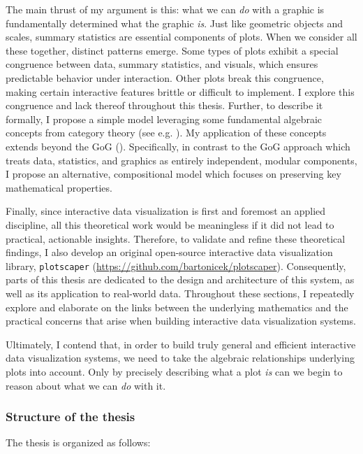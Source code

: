 \documentclass[
  openany]{book}
\theoremstyle{definition}
\theoremstyle{definition}
\theoremstyle{definition}
\theoremstyle{definition}
\theoremstyle{remark}
\begin{document}
The main thrust of my argument is this: what we can \emph{do} with a graphic is fundamentally determined what the graphic \emph{is}. Just like geometric objects and scales, summary statistics are essential components of plots. When we consider all these together, distinct patterns emerge. Some types of plots exhibit a special congruence between data, summary statistics, and visuals, which ensures predictable behavior under interaction. Other plots break this congruence, making certain interactive features brittle or difficult to implement. I explore this congruence and lack thereof throughout this thesis. Further, to describe it formally, I propose a simple model leveraging some fundamental algebraic concepts from category theory (see e.g. ). My application of these concepts extends beyond the GoG (). Specifically, in contrast to the GoG approach which treats data, statistics, and graphics as entirely independent, modular components, I propose an alternative, compositional model which focuses on preserving key mathematical properties.

Finally, since interactive data visualization is first and foremost an applied discipline, all this theoretical work would be meaningless if it did not lead to practical, actionable insights. Therefore, to validate and refine these theoretical findings, I also develop an original open-source interactive data visualization library, \texttt{plotscaper} (\url{https://github.com/bartonicek/plotscaper}). Consequently, parts of this thesis are dedicated to the design and architecture of this system, as well as its application to real-world data. Throughout these sections, I repeatedly explore and elaborate on the links between the underlying mathematics and the practical concerns that arise when building interactive data visualization systems.

Ultimately, I contend that, in order to build truly general and efficient interactive data visualization systems, we need to take the algebraic relationships underlying plots into account. Only by precisely describing what a plot \emph{is} can we begin to reason about what we can \emph{do} with it.

\subsubsection{Structure of the thesis}\label{structure-of-the-thesis}

The thesis is organized as follows:
\end{document}
